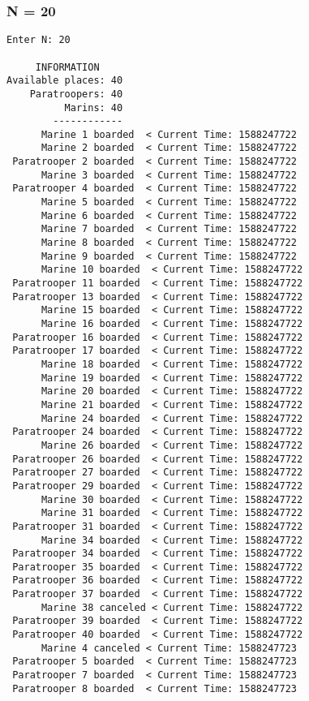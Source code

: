 \documentclass{article}
\begin{document}
\subsubsection*{N = 20}
\begin{lstlisting}[]
Enter N: 20

     INFORMATION
Available places: 40
    Paratroopers: 40
          Marins: 40
        ------------
      Marine 1 boarded  < Current Time: 1588247722 
      Marine 2 boarded  < Current Time: 1588247722 
 Paratrooper 2 boarded  < Current Time: 1588247722 
      Marine 3 boarded  < Current Time: 1588247722 
 Paratrooper 4 boarded  < Current Time: 1588247722 
      Marine 5 boarded  < Current Time: 1588247722 
      Marine 6 boarded  < Current Time: 1588247722 
      Marine 7 boarded  < Current Time: 1588247722 
      Marine 8 boarded  < Current Time: 1588247722 
      Marine 9 boarded  < Current Time: 1588247722 
      Marine 10 boarded  < Current Time: 1588247722 
 Paratrooper 11 boarded  < Current Time: 1588247722 
 Paratrooper 13 boarded  < Current Time: 1588247722 
      Marine 15 boarded  < Current Time: 1588247722 
      Marine 16 boarded  < Current Time: 1588247722 
 Paratrooper 16 boarded  < Current Time: 1588247722 
 Paratrooper 17 boarded  < Current Time: 1588247722 
      Marine 18 boarded  < Current Time: 1588247722 
      Marine 19 boarded  < Current Time: 1588247722 
      Marine 20 boarded  < Current Time: 1588247722 
      Marine 21 boarded  < Current Time: 1588247722 
      Marine 24 boarded  < Current Time: 1588247722 
 Paratrooper 24 boarded  < Current Time: 1588247722 
      Marine 26 boarded  < Current Time: 1588247722 
 Paratrooper 26 boarded  < Current Time: 1588247722 
 Paratrooper 27 boarded  < Current Time: 1588247722 
 Paratrooper 29 boarded  < Current Time: 1588247722 
      Marine 30 boarded  < Current Time: 1588247722 
      Marine 31 boarded  < Current Time: 1588247722 
 Paratrooper 31 boarded  < Current Time: 1588247722 
      Marine 34 boarded  < Current Time: 1588247722 
 Paratrooper 34 boarded  < Current Time: 1588247722 
 Paratrooper 35 boarded  < Current Time: 1588247722 
 Paratrooper 36 boarded  < Current Time: 1588247722 
 Paratrooper 37 boarded  < Current Time: 1588247722 
      Marine 38 canceled < Current Time: 1588247722 
 Paratrooper 39 boarded  < Current Time: 1588247722 
 Paratrooper 40 boarded  < Current Time: 1588247722 
      Marine 4 canceled < Current Time: 1588247723 
 Paratrooper 5 boarded  < Current Time: 1588247723 
 Paratrooper 7 boarded  < Current Time: 1588247723 
 Paratrooper 8 boarded  < Current Time: 1588247723 

\end{lstlisting}
\end{document}
